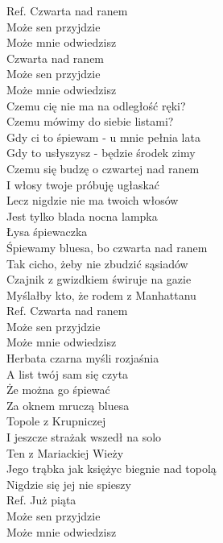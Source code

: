 
Ref. Czwarta nad ranem \tab{} \\
 Może sen przyjdzie \tab{}\\
 Może mnie odwiedzisz \tab{}\\
 Czwarta nad ranem \tab{}\\
 Może sen przyjdzie \tab{}\\
 Może mnie odwiedzisz \tab{}\\
\hops
Czemu cię nie ma na odległość ręki? \\
Czemu mówimy do siebie listami? \\
Gdy ci to śpiewam - u mnie pełnia lata \\
Gdy to usłyszysz - będzie środek zimy \\ 
\hops
Czemu się budzę o czwartej nad ranem \\
I włosy twoje próbuję ugłaskać \\
Lecz nigdzie nie ma twoich włosów \\
Jest tylko blada nocna lampka\tab{} \\
Łysa śpiewaczka \tab{}\\
\hops
Śpiewamy bluesa, bo czwarta nad ranem \\
Tak cicho, żeby nie zbudzić sąsiadów \\
Czajnik z gwizdkiem świruje na gazie \\
Myślałby kto, że rodem z Manhattanu \\
\hops
Ref. Czwarta nad ranem \tab{$|$}\\
 Może sen przyjdzie \tab{$|$}\\
 Może mnie odwiedzisz \\
\hops
Herbata czarna myśli rozjaśnia \\
A list twój sam się czyta \\
Że można go śpiewać \\
Za oknem mruczą bluesa \\
Topole z Krupniczej\\
\hops
I jeszcze strażak wszedł na solo \\
Ten z Mariackiej Wieży \\
Jego trąbka jak księżyc biegnie nad topolą \\
Nigdzie się jej nie spieszy \\
\hops
Ref. Już piąta \tab{} \tab{$|$}\\
 Może sen przyjdzie \tab{$|$}\\
 Może mnie odwiedzisz \\